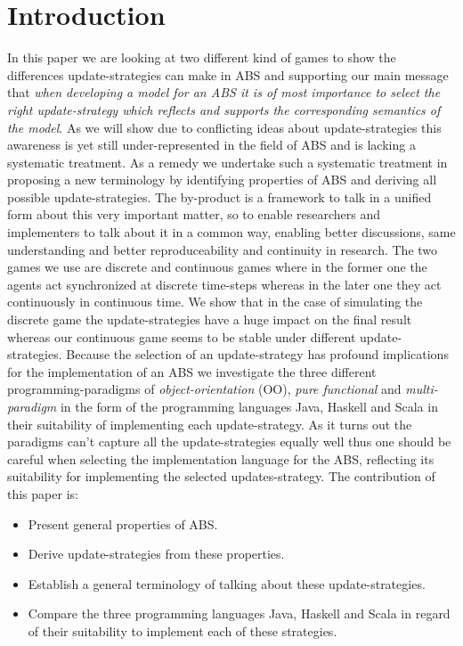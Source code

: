\section{Introduction}
In this paper we are looking at two different kind of games to show the differences update-strategies can make in ABS and supporting our main message that \textit{when developing a model for an ABS it is of most importance to select the right update-strategy which reflects and supports the corresponding semantics of the model}. As we will show due to conflicting ideas about update-strategies this awareness is yet still under-represented in the field of ABS and is lacking a systematic treatment. As a remedy we undertake such a systematic treatment in proposing a new terminology by identifying properties of ABS and deriving all possible update-strategies. The by-product is a framework to talk in a unified form about this very important matter, so to enable researchers and implementers to talk about it in a common way, enabling better discussions, same understanding and better reproduceability and continuity in research.
The two games we use are discrete and continuous games where in the former one the agents act synchronized at discrete time-steps whereas in the later one they act continuously in continuous time. We show that in the case of simulating the discrete game the update-strategies have a huge impact on the final result whereas our continuous game seems to be stable under different update-strategies.
Because the selection of an update-strategy has profound implications for the implementation of an ABS we investigate the three different programming-paradigms of \textit{object-orientation} (OO), \textit{pure functional} and \textit{multi-paradigm} in the form of the programming languages Java, Haskell and Scala in their suitability of implementing each update-strategy. As it turns out the paradigms can't capture all the update-strategies equally well thus one should be careful when selecting the implementation language for the ABS, reflecting its suitability for implementing the selected updates-strategy. The contribution of this paper is:
\begin{itemize}
	\item Present general properties of ABS.
	\item Derive update-strategies from these properties.
	\item Establish a general terminology of talking about these update-strategies.
	\item Compare the three programming languages Java, Haskell and Scala in regard of their suitability to implement each of these strategies.
\end{itemize}